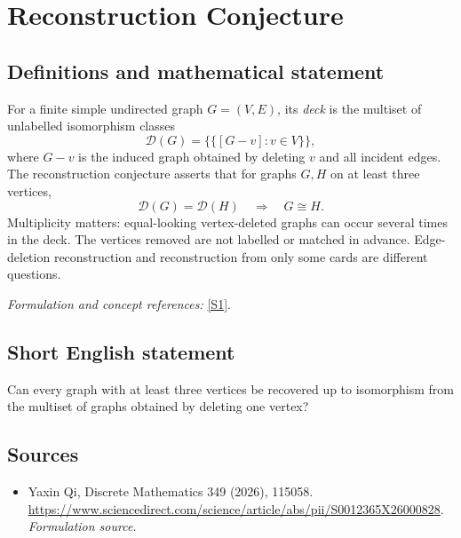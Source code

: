 \documentclass[11pt]{article}
\begin{document}
\section*{\texorpdfstring{Reconstruction Conjecture}{Reconstruction Conjecture}}\label{15}
\subsection{Definitions and mathematical statement}
For a finite simple undirected graph $G=(V,E)$, its \emph{deck} is the multiset of unlabelled isomorphism classes
\[
 \mathcal D(G)=\bigl\{\!\bigl\{[G-v]:v\in V\bigr\}\!\bigr\},
\]
where $G-v$ is the induced graph obtained by deleting $v$ and all incident edges. The reconstruction conjecture asserts that for graphs $G,H$ on at least three vertices,
\[
 \mathcal D(G)=\mathcal D(H)\quad\Longrightarrow\quad G\cong H.
\]
Multiplicity matters: equal-looking vertex-deleted graphs can occur several times in the deck. The vertices removed are not labelled or matched in advance. Edge-deletion reconstruction and reconstruction from only some cards are different questions.
\par\smallskip\textit{Formulation and concept references:} \href{https://www.sciencedirect.com/science/article/abs/pii/S0012365X26000828}{[S1]}.

\subsection{Short English statement}
Can every graph with at least three vertices be recovered up to isomorphism from the multiset of graphs obtained by deleting one vertex?
\subsection{Sources}
\begin{itemize}
\item[S1]Yaxin Qi, Discrete Mathematics 349 (2026), 115058.
\url{https://www.sciencedirect.com/science/article/abs/pii/S0012365X26000828}.
\textit{Formulation source.}
\end{itemize}
\end{document}
